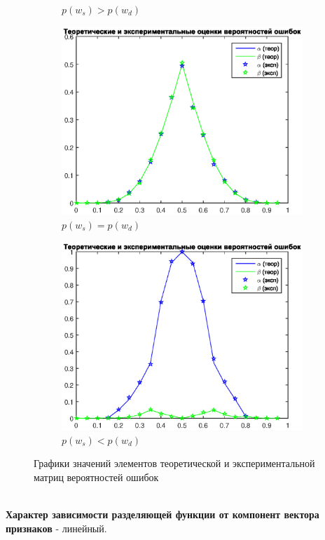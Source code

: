 \documentclass[10pt]{article} %
\begin{document}
\begin{spacing}{1}
\begin{figure}[h]
\begin{subfigure}{.5\textwidth}
		\caption{$p(w_s) > p(w_d)$}
	\end{subfigure}%
	\begin{subfigure}{.5\textwidth}
		\centering
		\includegraphics[width=1.1\linewidth]{eqProb.eps}
		\caption{$p(w_s) = p(w_d)$}
	\end{subfigure}
	\begin{subfigure}{.5\textwidth}
		\centering
		\includegraphics[width=1.1\linewidth]{sD2.eps}
		\caption{$p(w_s) < p(w_d)$}
	\end{subfigure}
	\caption{Графики значений элементов теоретической и экспериментальной матриц вероятностей ошибок}
\end{figure}
~\\
\textbf{Характер зависимости разделяющей функции от компонент вектора признаков} - линейный.














\end{spacing}
\end{document}

